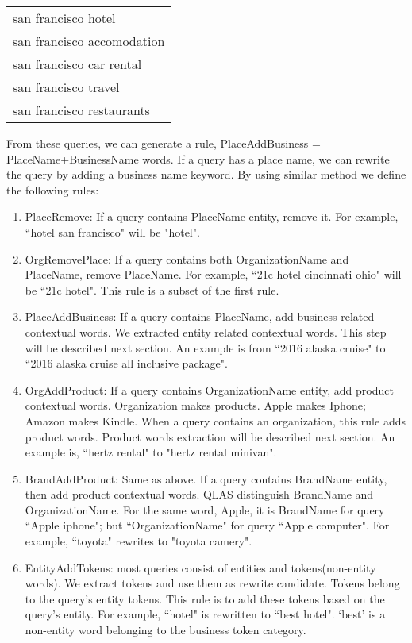 \documentclass{sig-alternate}
\begin{document}
\begin{tabular}{l} 
san francisco hotel \\
san francisco accomodation \\
san francisco car rental \\
san francisco travel \\
san francisco restaurants \\
\end{tabular}

  From these queries, we can generate a rule, PlaceAddBusiness = PlaceName+BusinessName words. If a query has a place name, we can rewrite the query by adding a business name keyword.
By using similar method we define the following rules:

\begin{enumerate}
\item  PlaceRemove: If a query contains PlaceName entity, remove it.  For example,  ``hotel san francisco" will be "hotel".
 
\item  OrgRemovePlace: If a query contains both OrganizationName and PlaceName, remove PlaceName. For example, ``21c hotel cincinnati ohio" will be ``21c hotel". This rule is a subset of the first rule.

\item  PlaceAddBusiness: If a query contains PlaceName, add business related contextual words. We extracted  entity related contextual words. This step will be described next section. An example is from ``2016 alaska cruise" to  ``2016 alaska cruise all inclusive package".

\item  OrgAddProduct: If a query contains OrganizationName entity, add product contextual words. Organization makes products. Apple makes Iphone; Amazon makes Kindle. When a query contains an organization, this rule adds product words. Product words extraction will be described next section. An example is,  ``hertz rental" to "hertz rental minivan".

\item  BrandAddProduct: Same as above. If a query contains BrandName entity, then add product contextual words. QLAS distinguish BrandName and OrganizationName. For the same word, Apple, it is BrandName for query ``Apple iphone"; but ``OrganizationName" for query ``Apple computer". For example, ``toyota" rewrites to "toyota camery".

\item  EntityAddTokens:  most queries consist of entities and tokens(non-entity words). We extract tokens and use them as rewrite candidate. Tokens belong to the query's entity tokens.  This rule is to add these tokens based on the query's entity. For example, ``hotel" is rewritten to ``best hotel". `best' is a non-entity word belonging to the business token category. 
\end{enumerate}
\end{document}

